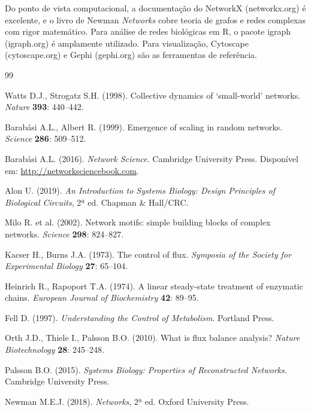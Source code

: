 Do ponto de vista computacional, a documentação do NetworkX (networkx.org) é excelente,
e o livro de Newman \textit{Networks} \cite{newman2018} cobre teoria de grafos e redes
complexas com rigor matemático. Para análise de redes biológicas em R, o pacote igraph
(igraph.org) é amplamente utilizado. Para visualização, Cytoscape (cytoscape.org) e Gephi
(gephi.org) são as ferramentas de referência.

\begin{thebibliography}{99}

Watts D.J., Strogatz S.H. (1998).
Collective dynamics of `small-world' networks.
\textit{Nature} \textbf{393}: 440--442.

Barabási A.L., Albert R. (1999).
Emergence of scaling in random networks.
\textit{Science} \textbf{286}: 509--512.

Barabási A.L. (2016).
\textit{Network Science}.
Cambridge University Press.
Disponível em: \url{http://networksciencebook.com}.

Alon U. (2019).
\textit{An Introduction to Systems Biology: Design Principles of Biological Circuits}, 2ª ed.
Chapman \& Hall/CRC.

Milo R. et al. (2002).
Network motifs: simple building blocks of complex networks.
\textit{Science} \textbf{298}: 824--827.

Kacser H., Burns J.A. (1973).
The control of flux.
\textit{Symposia of the Society for Experimental Biology} \textbf{27}: 65--104.

Heinrich R., Rapoport T.A. (1974).
A linear steady-state treatment of enzymatic chains.
\textit{European Journal of Biochemistry} \textbf{42}: 89--95.

Fell D. (1997).
\textit{Understanding the Control of Metabolism}.
Portland Press.

Orth J.D., Thiele I., Palsson B.O. (2010).
What is flux balance analysis?
\textit{Nature Biotechnology} \textbf{28}: 245--248.

Palsson B.O. (2015).
\textit{Systems Biology: Properties of Reconstructed Networks}.
Cambridge University Press.

Newman M.E.J. (2018).
\textit{Networks}, 2ª ed.
Oxford University Press.

\end{thebibliography}

